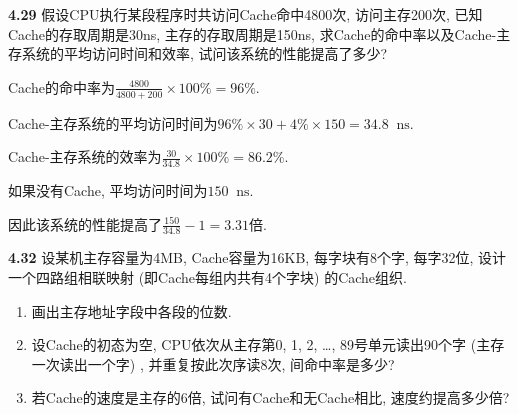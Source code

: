 \documentclass[UTF8]{report}
\newcommand*{\unit}[1]{\mathop{}\!\mathrm{#1}}
\newcommand{\problem}[1]{{\setlength{\parskip}{10pt}\noindent \bf{#1}}}
\newenvironment{solution}{{\noindent\hskip 2em \bf 解 \quad}}{}
\begin{document}
\problem{4.29} 假设CPU执行某段程序时共访问Cache命中4800次, 访问主存200次, 已知Cache的存取周期是30ns, 主存的存取周期是150ns, 求Cache的命中率以及Cache-主存系统的平均访问时间和效率, 试问该系统的性能提高了多少?

\begin{solution}

    Cache的命中率为$\frac{4800}{4800+200} \times 100\% = 96\%$.
    
    Cache-主存系统的平均访问时间为$96\% \times 30 + 4\% \times 150 = 34.8\unit{ns}$.
    
    Cache-主存系统的效率为$\frac{30}{34.8} \times 100\% = 86.2\%$.
    
    如果没有Cache, 平均访问时间为$150\unit{ns}$.

    因此该系统的性能提高了$\frac{150}{34.8} - 1 = 3.31$倍.
\end{solution}


\problem{4.32} 设某机主存容量为4MB, Cache容量为16KB, 每字块有8个字, 每字32位, 设计一个四路组相联映射 (即Cache每组内共有4个字块) 的Cache组织.
\begin{enumerate}[label=(\arabic*)]
    \item 画出主存地址字段中各段的位数.
    \item 设Cache的初态为空, CPU依次从主存第0, 1, 2, …, 89号单元读出90个字 (主存一次读出一个字) , 并重复按此次序读8次, 间命中率是多少?
    \item 若Cache的速度是主存的6倍, 试问有Cache和无Cache相比, 速度约提高多少倍?
\end{enumerate}
\end{document}
